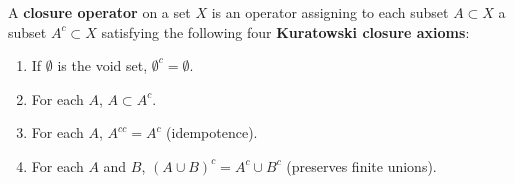 A \textbf{closure operator} on a set $X$ is an operator assigning to each subset $A \subset X$ a subset $A^{c} \subset X$ satisfying the following four \textbf{Kuratowski closure axioms}:

\begin{enumerate}
\item[(a)] If $\emptyset$ is the void set, $\emptyset^{c} = \emptyset$.
\item[(b)] For each $A$, $A \subset A^{c}$.
\item[(c)] For each $A$, $A^{cc} = A^{c}$ (idempotence).
\item[(d)] For each $A$ and $B$, $(A \cup B)^{c} = A^{c} \cup B^{c}$ (preserves finite unions).
\end{enumerate}

